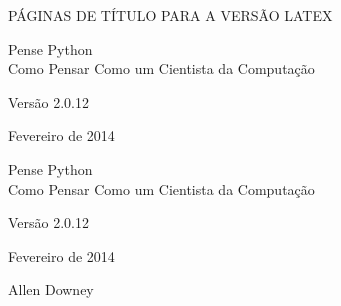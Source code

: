 \documentclass[10pt]{book}
\newcommand{\theversion}{2.0.12}
\newcommand{\thedate}{Fevereiro de 2014}
\begin{document}
\begin{latexonly}

\renewcommand{\blankpage}{\thispagestyle{empty} \quad \newpage}


PÁGINAS DE TÍTULO PARA A VERSÃO LATEX

\thispagestyle{empty}

\begin{flushright}
\vspace*{2.0in}

\begin{spacing}{3}
{\huge Pense Python}\\
{\Large Como Pensar Como um Cientista da Computação}
\end{spacing}

\vspace{0.25in}

Versão \theversion

\thedate

\vfill

\end{flushright}


\blankpage
\blankpage

\pagebreak
\thispagestyle{empty}

\begin{flushright}
\vspace*{2.0in}

\begin{spacing}{3}
{\huge Pense Python}\\
{\Large Como Pensar Como um Cientista da Computação}
\end{spacing}

\vspace{0.25in}

Versão \theversion

\thedate

\vspace{1in}


{\Large
Allen Downey\\
}


\vspace{0.5in}


\end{flushright}
\end{latexonly}
\end{document}
